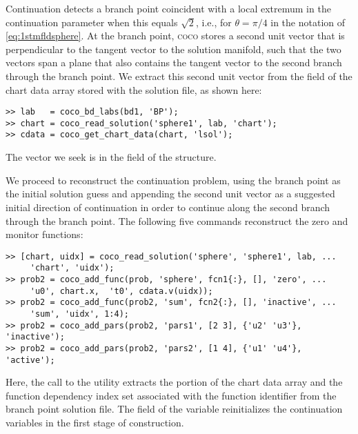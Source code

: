 Continuation detects a branch point coincident with a local extremum in the continuation parameter  when this equals $\sqrt{2}$, i.e., for $\theta=\pi/4$ in the notation of \eqref{eq:1stmfldsphere}. At the branch point, \textsc{coco} stores a second unit vector that is perpendicular to the tangent vector to the solution manifold, such that the two vectors span a plane that also contains the tangent vector to the second branch through the branch point. We extract this second unit vector from the  field of the chart data array stored with the solution file, as shown here:
\begin{lstlisting}[language=coco-highlight]
>> lab   = coco_bd_labs(bd1, 'BP');
>> chart = coco_read_solution('sphere1', lab, 'chart');
>> cdata = coco_get_chart_data(chart, 'lsol');
\end{lstlisting}
The vector we seek is in the  field of the  structure.

We proceed to reconstruct the continuation problem, using the branch point as the initial solution guess and appending the second unit vector as a suggested initial direction of continuation in order to continue along the second branch through the branch point. The following five commands reconstruct the zero and monitor functions:
\begin{lstlisting}[language=coco-highlight]
>> [chart, uidx] = coco_read_solution('sphere', 'sphere1', lab, ...
     'chart', 'uidx');
>> prob2 = coco_add_func(prob, 'sphere', fcn1{:}, [], 'zero', ...
     'u0', chart.x,  't0', cdata.v(uidx));
>> prob2 = coco_add_func(prob2, 'sum', fcn2{:}, [], 'inactive', ...
     'sum', 'uidx', 1:4);
>> prob2 = coco_add_pars(prob2, 'pars1', [2 3], {'u2' 'u3'}, 'inactive');
>> prob2 = coco_add_pars(prob2, 'pars2', [1 4], {'u1' 'u4'}, 'active');
\end{lstlisting}
Here, the call to the  utility extracts the portion of the chart data array and the function dependency index set associated with the function identifier  from the branch point solution file. The  field of the  variable reinitializes the continuation variables in the first stage of construction.

